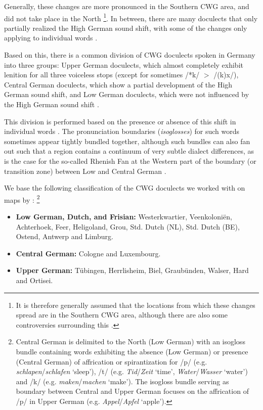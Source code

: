 \documentclass[a4paper]{article}
\begin{document}
Generally, these changes are more pronounced
in the Southern CWG area, and did not take place in the North
\cite[p. 33]{noble1983modern}%
\footnote{%
It is therefore generally assumed that the locations
from which these changes spread are in the Southern CWG area,
although there are also some controversies surrounding this
\citep[pp. 155--181]{goblirsch2005lautverschiebungen}.
}.
In between, there are many doculects
that only partially realized the High German sound shift,
with some of the changes only applying to individual words
\citep[p. 63]{koenig2015dtv}.

Based on this, there is a common division
of CWG doculects spoken in Germany into three groups:
Upper German doculects, which almost completely
exhibit lenition for all three voiceless stops
(except for sometimes /*k/ $>$ /(k)x/),
Central German doculects, which show a
partial development of the High German sound shift,
and Low German doculects,
which were not influenced by the High German sound shift
\citep[pp. 33, 55]{noble1983modern}.

This division is performed based on
the presence or absence of this shift in individual words \citep[p. 63]{koenig2015dtv}.
The pronunciation boundaries (\textit{isoglosses}) for such words
sometimes appear tightly bundled together,
although such bundles can also fan out such that a region
contains a continuum of very subtle dialect differences,
as is the case for the so-called Rhenish Fan at the Western part
of the boundary (or transition zone) between Low and Central German
\citep[pp. 63, 138, 141]{koenig2015dtv}.

We base the following classification of
the CWG doculects we worked with
on maps by \citet[pp. 64, 230--231]{koenig2015dtv}:%
\footnote{%
Central German is delimited %
to the North (Low German) with an isogloss bundle
containing words exhibiting
the absence (Low German) or presence (Central German)
of affrication or spirantization for
/p/ (e.g. \textit{schlapen}/\textit{schlafen} `sleep'),
/t/ (e.g. \textit{Tid}/\textit{Zeit} `time',\linebreak
\textit{Water}/\textit{Wasser} `water') and
/k/ (e.g. \textit{maken}/\textit{machen} `make').
The isogloss bundle serving as boundary between
Central and Upper German focuses on the
affrication of /p/ in Upper German
(e.g. \textit{Appel}/\textit{Apfel} `apple').
}

\begin{itemize}
\item
\textbf{Low German, Dutch, and Frisian:}
Westerkwartier, Veenkoloni\"{e}n, Achterhoek,
Feer, Heligoland, Grou,
Std. Dutch (NL), Std. Dutch (BE), Ostend, Antwerp and Limburg.

\item
\textbf{Central German:}
Cologne and Luxembourg.

\item
\textbf{Upper German:}
T\"{u}bingen, Herrlisheim,
Biel, Graub\"{u}nden, Walser, Hard and Ortisei.
\end{itemize}
\end{document}
